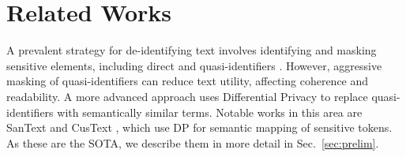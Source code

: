 \documentclass[11pt]{article}
\newcommand{\clusant}{CluSanT\xspace}
\begin{document}



\section{Related Works}

A prevalent strategy for de-identifying text involves identifying and masking sensitive elements, including direct and quasi-identifiers \cite{pilan2022text,presidio}. However, aggressive masking of quasi-identifiers can reduce text utility, affecting coherence and readability. 
A more advanced approach uses Differential Privacy to replace quasi-identifiers with semantically similar terms. Notable works in this area are SanText \cite{yue2021differential} and CusText \cite{chen2023customized}, which use DP for semantic mapping of sensitive tokens. As these are the SOTA, we describe them in more detail in Sec.~\ref{sec:prelim}.

\end{document}
